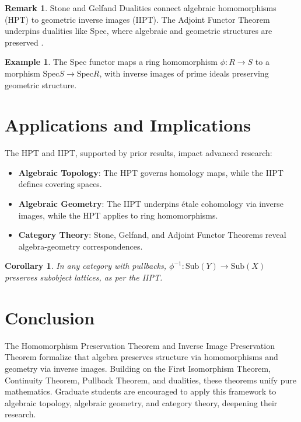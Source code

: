 \documentclass{article}
\theoremstyle{plain}
\newtheorem{corollary}{Corollary}
\theoremstyle{definition}
\newtheorem{example}{Example}
\newtheorem{remark}{Remark}
\newcommand{\Spec}{\mathrm{Spec}}
\begin{document}
\begin{remark}
Stone and Gelfand Dualities \cite{johnstone, takesaki} connect algebraic homomorphisms (HPT) to geometric inverse images (IIPT). The Adjoint Functor Theorem \cite{mac} underpins dualities like Spec, where algebraic and geometric structures are preserved \cite{hart}.
\end{remark}

\begin{example}
The Spec functor maps a ring homomorphism \(\phi: R \to S\) to a morphism \(\Spec S \to \Spec R\), with inverse images of prime ideals preserving geometric structure.
\end{example}

\section{Applications and Implications}
The HPT and IIPT, supported by prior results, impact advanced research:

\begin{itemize}
    \item \textbf{Algebraic Topology}: The HPT governs homology maps, while the IIPT defines covering spaces.
    \item \textbf{Algebraic Geometry}: The IIPT underpins étale cohomology via inverse images, while the HPT applies to ring homomorphisms.
    \item \textbf{Category Theory}: Stone, Gelfand, and Adjoint Functor Theorems reveal algebra-geometry correspondences.
\end{itemize}

\begin{corollary}
In any category with pullbacks, \(\phi^{-1}: \text{Sub}(Y) \to \text{Sub}(X)\) preserves subobject lattices, as per the IIPT.
\end{corollary}

\section{Conclusion}
The Homomorphism Preservation Theorem and Inverse Image Preservation Theorem formalize that algebra preserves structure via homomorphisms and geometry via inverse images. Building on the First Isomorphism Theorem, Continuity Theorem, Pullback Theorem, and dualities, these theorems unify pure mathematics. Graduate students are encouraged to apply this framework to algebraic topology, algebraic geometry, and category theory, deepening their research.
\end{document}
